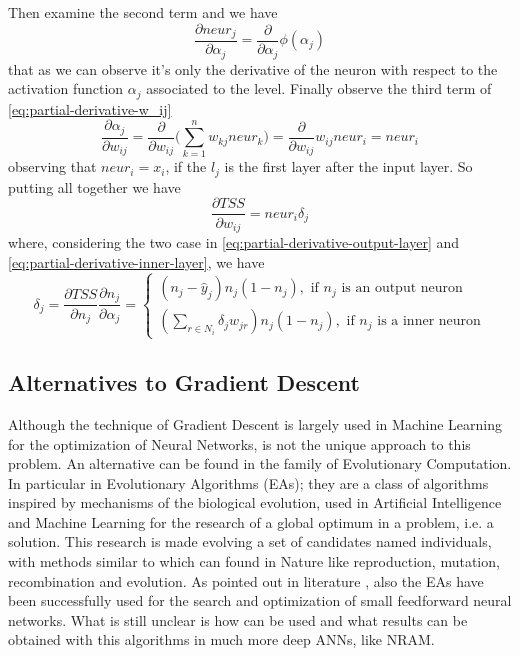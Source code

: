 Then examine the second term and we have
\begin{equation}
	\frac{\partial{neur_j}}{\partial{\alpha_j}} = \frac{\partial{}}{\partial{\alpha_j}}\phi(\alpha_j)
\end{equation}
that as we can observe it's only the derivative of the neuron with respect to the activation function $\alpha_j$ associated to the level.\newline\newline
Finally observe the third term of \ref{eq:partial-derivative-w_ij}
\begin{equation}
	\frac{\partial{\alpha_j}}{\partial{w_{ij}}} = \frac{\partial{}}{\partial{w_{ij}}}\Bigg(\sum\limits_{k=1}^n w_{kj}neur_k\Bigg) = \frac{\partial{}}{\partial{w_{ij}}}w_{ij}neur_i = neur_i
\end{equation}
observing that $neur_i = x_i$, if the $l_j$ is the first layer after the input layer.\newline\newline
So putting all together we have 
\begin{equation}
	\frac{\partial{TSS}}{\partial{w_{ij}}} = neur_i\delta_j
\end{equation}
where, considering the two case in \ref{eq:partial-derivative-output-layer} and \ref{eq:partial-derivative-inner-layer}, we have
\begin{equation}
	\delta_j = \frac{\partial{TSS}}{\partial{n_j}}\frac{\partial{n_j}}{\partial{\alpha_j}} = \left.
	\begin{cases}
		(n_j - \hat{y}_j)n_j(1 - n_j),\textrm{ if } n_j \textrm{ is an output neuron} \\
(\sum\limits_{r	\in N_i}\delta_{j}w_{jr})n_{j}(1 - n_{j}), \textrm{ if }n_j\textrm{ is a inner neuron}
	\end{cases}\right.
\end{equation}

\subsection{Alternatives to Gradient Descent}
Although the technique of Gradient Descent is largely used in Machine Learning for the optimization of Neural Networks, is not the unique approach to this problem. An alternative can be found in the family of Evolutionary Computation. In particular in Evolutionary Algorithms (EAs); they are a class of algorithms inspired by mechanisms of the biological evolution, used in Artificial Intelligence and Machine Learning for the research of a global optimum in a problem, i.e. a solution. This research is made evolving a set of candidates named individuals, with methods similar to which can found in Nature like reproduction, mutation, recombination and evolution. As pointed out in literature \cite{Ilonen2003DifferentialET, Morse2016SimpleEO}, also the EAs have been successfully used for the search and optimization of small feedforward neural networks. What is still unclear is how can be used and what results can be obtained with this algorithms in much more deep ANNs, like NRAM.